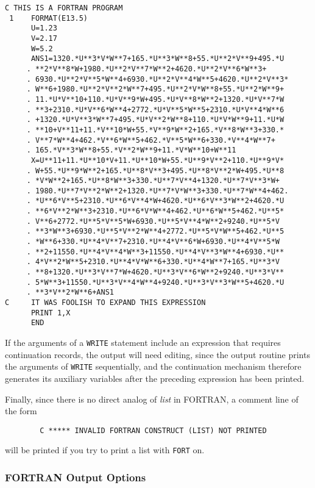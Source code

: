 \begin{verbatim}
C THIS IS A FORTRAN PROGRAM
 1    FORMAT(E13.5)
      U=1.23
      V=2.17
      W=5.2
      ANS1=1320.*U**3*V*W**7+165.*U**3*W**8+55.*U**2*V**9+495.*U
     . **2*V**8*W+1980.*U**2*V**7*W**2+4620.*U**2*V**6*W**3+
     . 6930.*U**2*V**5*W**4+6930.*U**2*V**4*W**5+4620.*U**2*V**3*
     . W**6+1980.*U**2*V**2*W**7+495.*U**2*V*W**8+55.*U**2*W**9+
     . 11.*U*V**10+110.*U*V**9*W+495.*U*V**8*W**2+1320.*U*V**7*W
     . **3+2310.*U*V**6*W**4+2772.*U*V**5*W**5+2310.*U*V**4*W**6
     . +1320.*U*V**3*W**7+495.*U*V**2*W**8+110.*U*V*W**9+11.*U*W
     . **10+V**11+11.*V**10*W+55.*V**9*W**2+165.*V**8*W**3+330.*
     . V**7*W**4+462.*V**6*W**5+462.*V**5*W**6+330.*V**4*W**7+
     . 165.*V**3*W**8+55.*V**2*W**9+11.*V*W**10+W**11
      X=U**11+11.*U**10*V+11.*U**10*W+55.*U**9*V**2+110.*U**9*V*
     . W+55.*U**9*W**2+165.*U**8*V**3+495.*U**8*V**2*W+495.*U**8
     . *V*W**2+165.*U**8*W**3+330.*U**7*V**4+1320.*U**7*V**3*W+
     . 1980.*U**7*V**2*W**2+1320.*U**7*V*W**3+330.*U**7*W**4+462.
     . *U**6*V**5+2310.*U**6*V**4*W+4620.*U**6*V**3*W**2+4620.*U
     . **6*V**2*W**3+2310.*U**6*V*W**4+462.*U**6*W**5+462.*U**5*
     . V**6+2772.*U**5*V**5*W+6930.*U**5*V**4*W**2+9240.*U**5*V
     . **3*W**3+6930.*U**5*V**2*W**4+2772.*U**5*V*W**5+462.*U**5
     . *W**6+330.*U**4*V**7+2310.*U**4*V**6*W+6930.*U**4*V**5*W
     . **2+11550.*U**4*V**4*W**3+11550.*U**4*V**3*W**4+6930.*U**
     . 4*V**2*W**5+2310.*U**4*V*W**6+330.*U**4*W**7+165.*U**3*V
     . **8+1320.*U**3*V**7*W+4620.*U**3*V**6*W**2+9240.*U**3*V**
     . 5*W**3+11550.*U**3*V**4*W**4+9240.*U**3*V**3*W**5+4620.*U
     . **3*V**2*W**6+ANS1
C     IT WAS FOOLISH TO EXPAND THIS EXPRESSION
      PRINT 1,X
      END
\end{verbatim}

If the arguments of a {\tt WRITE} statement include an expression that
requires continuation records, the output will need editing, since the
output routine prints the arguments of {\tt WRITE} sequentially, and the
continuation mechanism therefore generates its auxiliary variables after
the preceding expression has been printed.

Finally, since there is no direct analog of {\em list} in FORTRAN,
a comment line of the form
\begin{verbatim}
        C ***** INVALID FORTRAN CONSTRUCT (LIST) NOT PRINTED
\end{verbatim}
will be printed if you try to print a list with {\tt FORT} on.

\subsubsection{{FORTRAN} Output Options}

